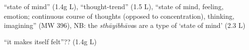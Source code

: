 \documentclass[10pt]{article}
\begin{document}
\begin{multicols}{2}
\begin{enumerate}[
			leftmargin=0em,
			rightmargin=0em,
		]
		 ``state of mind'' (1.4g L),
		``thought-trend'' (1.5 L), %
		``state of mind, feeling, emotion; continuous course of thoughts (opposed to concentration), thinking, imagining'' (MW 396),
		NB: the \textit{sthāyibhāva}s are a type of `state of mind' (2.3 L)

		 ``it makes itself felt''?? (1.4g L)


\end{enumerate}
\end{multicols}
\end{document}
